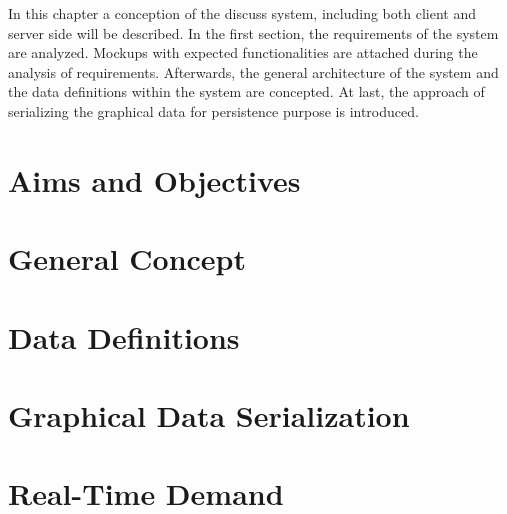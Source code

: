 In this chapter a conception of the discuss system, including both client and server side will be described. In the first section, the requirements of the system are analyzed. Mockups with expected functionalities are attached during the analysis of requirements. Afterwards, the general architecture of the system and the data definitions within the system are concepted. At last, the approach of serializing the graphical data for persistence purpose is introduced.


\section{Aims and Objectives}\label{sec:aims}

\section{General Concept}

\section{Data Definitions}\label{sec:data-concept}

\section{Graphical Data Serialization}\label{sec:graphical-data-serialization-concept}

\section{Real-Time Demand}\label{sec:real-time-concept}


% 

